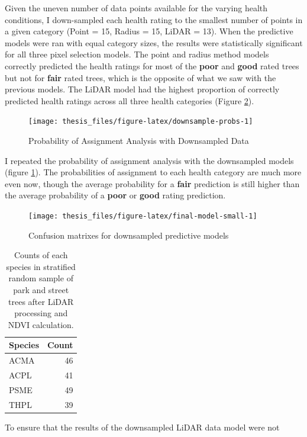 \documentclass[12pt,twoside]{reedthesis}
\begin{document}
Given the uneven number of data points available for the varying health
conditions, I down-sampled each health rating to the smallest number of
points in a given category (Point = 15, Radius = 15, LiDAR = 13). When
the predictive models were ran with equal category sizes, the results
were statistically significant for all three pixel selection models. The
point and radius method models correctly predicted the health ratings
for most of the \textbf{poor} and \textbf{good} rated trees but not for \textbf{fair}
rated trees, which is the opposite of what we saw with the previous
models. The LiDAR model had the highest proportion of correctly
predicted health ratings across all three health categories (Figure
\ref{fig:final-model-small}).
\begin{figure}

{\centering \texttt{[image: thesis\_files/figure-latex/downsample-probs-1]} 

}

\caption{Probability of Assignment Analysis with Downsampled Data}\label{fig:downsample-probs}
\end{figure}
I repeated the probability of assignment analysis with the downsampled
models (figure \ref{fig:downsample-probs}). The probabilities of
assignment to each health category are much more even now, though the
average probability for a \textbf{fair} prediction is still higher than the
average probability of a \textbf{poor} or \textbf{good} rating prediction.
\begin{figure}

{\centering \texttt{[image: thesis\_files/figure-latex/final-model-small-1]} 

}

\caption{Confusion matrixes for downsampled predictive models}\label{fig:final-model-small}
\end{figure}
\begin{longtable}[t]{lr}
\caption[Species counts post LiDAR processing]{\label{tab:final-lidar-counts}Counts of each species in stratified random sample of park and street trees after LiDAR processing and NDVI calculation.}\\
\toprule
Species & Count\\
\midrule
ACMA & 46\\
ACPL & 41\\
PSME & 49\\
THPL & 39\\
\bottomrule
\end{longtable}
To ensure that the results of the downsampled LiDAR data model were not
\end{document}
